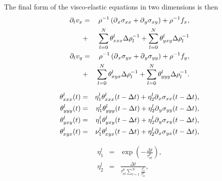 \documentclass[11pt]{article}
\begin{document}
The final form of the visco-elastic equations in two dimensions is then
\begin{eqnarray}
  \partial_t{v}_x 
     & = & \rho^{-1}\left(\mbox{$\partial$}_x \sigma_{xx} +\mbox{$\partial$}_y
           \sigma_{xy} \right) + \rho^{-1}f_x,       \nonumber\\
     & + & \sum_{l=0}^N\theta^l_{xxx}\Delta\rho^{-1}_{l} 
           +  \sum_{l=0}^N\theta^l_{yxy}\Delta\rho^{-1}_{l} 
           \nonumber\\ 
  \partial_t{v}_y 
     & = & \rho^{-1}\left(\mbox{$\partial$}_x \sigma_{yx} +\mbox{$\partial$}_y 
           \sigma_{yy}\right)  + \rho^{-1}f_y,                      \nonumber\\                 
     & + & \sum_{l=0}^N\theta^l_{xyx}\Delta\rho^{-1}_{l} 
           +  \sum_{l=0}^N\theta^l_{yyy}\Delta\rho^{-1}_{l} 
           .\nonumber\\ 
\end{eqnarray}

\begin{eqnarray}
\theta^l_{xxx}(t)  & = &\eta^l_1 \theta^l_{xxx}(t-\Delta t) 
            + \eta^l_2\mbox{$\partial$}_x\sigma_{xx}(t-\Delta t),  \nonumber \\
\theta^l_{yyy}(t)  & = &\eta^l_1 \theta^l_{yyy}(t-\Delta t) 
            + \eta^l_2\mbox{$\partial$}_y\sigma_{yy}(t-\Delta t),  \nonumber \\
\theta^l_{yxy}(t)  & = &\eta^l_1 \theta^l_{yxy}(t-\Delta t) 
            + \eta^l_2\mbox{$\partial$}_y\sigma_{xy}(t-\Delta t),  \nonumber \\
\theta^l_{xyx}(t)  & = &\nu^l_1 \theta^l_{xyx}(t-\Delta t) 
            + \eta^l_2\mbox{$\partial$}_x\sigma_{yx}(t-\Delta t),  \nonumber \\
\end{eqnarray}

\begin{eqnarray}
\eta^l_1  & = &\exp(-\frac{\Delta t}{\tau^{p}_{\sigma l}}) , \nonumber \\
\eta^l_2  & = &\frac{\Delta t}{\tau^{p}_{\sigma l}\sum_{l=1}^N
                                 \frac{\tau^{p}_{\epsilon l}}
                                  {\tau^{p}_{\sigma l}}}, \nonumber \\
\end{eqnarray}
\end{document}
